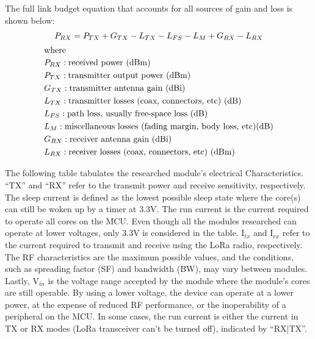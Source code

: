 The full link budget equation that accounts for all sources of gain and loss is
shown below:
\begin{gather}\label{eq-link-budget-full}
P_{RX} = P_{TX} + G_{TX} - L_{TX} - L_{FS} - L_M + G_{RX} - L_{RX} \\
\intertext{where}
\begin{aligned}
& P_{RX}: \text{received power (dBm)} \\
& P_{TX}: \text{transmitter output power (dBm)} \\
& G_{TX}: \text{transmitter antenna gain (dBi)} \\
& L_{TX}: \text{transmitter losses (coax, connectors, etc) (dB)} \\
& L_{FS}: \text{path loss, usually free-space loss (dB)} \\
& L_{M}: \text{miscellaneous losses (fading margin, body loss, etc)(dB)} \\
& G_{RX}: \text{receiver antenna gain (dBi)} \\
& L_{RX}: \text{receiver losses (coax, connectors, etc) (dBm)} \\
\end{aligned}\notag
\end{gather}

The following table tabulates the researched module's electrical
Characteristics. ``TX'' and ``RX'' refer to the transmit power and receive
sensitivity, respectively. The sleep current is defined as the lowest possible
sleep state where the core(s) can still be woken up by a timer at 3.3V. The run
current is the current required to operate all cores on the MCU. Even though all
the modules researched can operate at lower voltages, only 3.3V is considered in
the table. I$_{tx}$ and I$_{rx}$ refer to the current required to transmit and
receive using the LoRa radio, respectively.  The RF characteristics are the
maximum possible values, and the conditions, such as spreading factor (SF) and
bandwidth (BW), may vary between modules.  Lastly, V$_{in}$ is the voltage range
accepted by the module where the module's cores are still operable. By using a
lower voltage, the device can operate at a lower power, at the expense of
reduced RF performance, or the inoperability of a peripheral on the MCU. In some
cases, the run current is either the current in TX or RX modes (LoRa transceiver
can't be turned off), indicated by ``RX|TX''.

